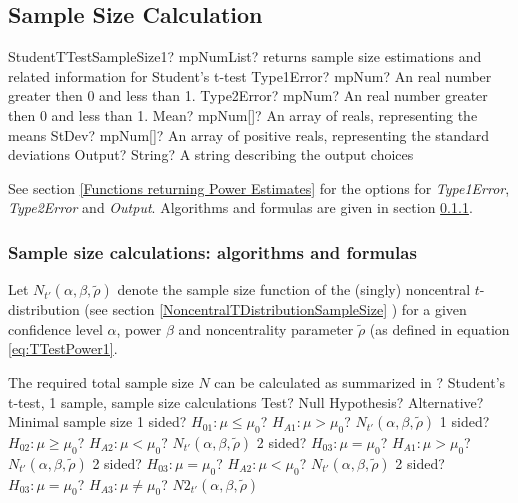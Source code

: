 \subsection{Sample Size Calculation}


\begin{mpFunctionsExtract}
	\mpFunctionFiveNotImplemented
	{StudentTTestSampleSize1? mpNumList? returns sample size estimations and related information for Student's t-test}
	{Type1Error? mpNum? An real number greater then 0 and less than 1.}
	{Type2Error? mpNum? An real number greater then 0 and less than 1.}
	{Mean? mpNum[]? An array of reals, representing the means}
	{StDev? mpNum[]? An array of positive reals, representing the standard deviations}
	{Output? String? A string describing the output choices}
\end{mpFunctionsExtract}

\vspace{0.3cm}
See section \ref{Functions returning Power Estimates} for the options for {\itshape\sffamily Type1Error},  {\itshape\sffamily Type2Error} and {\itshape\sffamily Output}. Algorithms and formulas are given in section \ref{1SampleTTest_SampleSize}.



\subsubsection{Sample size calculations: algorithms and formulas}
\label{1SampleTTest_SampleSize}
Let $N_{t'}\left(\alpha, \beta, \widetilde{\rho} \right)$ denote the sample size function of the (singly) noncentral $t$-distribution (see section \ref{NoncentralTDistributionSampleSize} ) for a given confidence level $\alpha$, power $\beta$ and noncentrality parameter $\widetilde{\rho}$ (as defined in equation \ref{eq:TTestPower1}. 


\mpTableFourColsTwoRowsThreeRows
{The required total sample size $N$ can be calculated as summarized in ? Student's t-test, 1 sample, sample size calculations}
{Test? Null Hypothesis? Alternative? Minimal sample size}
{1 sided? $H_{01}: \mu \leq \mu_0$? $H_{A1}: \mu > \mu_0$? $N_{t'}\left(\alpha, \beta, \widetilde{\rho} \right)$}
{1 sided? $H_{02}: \mu \geq \mu_0$? $H_{A2}: \mu < \mu_0$? $N_{t'}\left(\alpha, \beta, \widetilde{\rho} \right)$}
{2 sided? $H_{03}: \mu = \mu_0$? $H_{A1}: \mu > \mu_0$? $N_{t'}\left(\alpha, \beta, \widetilde{\rho} \right)$}
{2 sided? $H_{03}: \mu = \mu_0$? $H_{A2}: \mu < \mu_0$? $N_{t'}\left(\alpha, \beta, \widetilde{\rho} \right)$}
{2 sided? $H_{03}: \mu = \mu_0$? $H_{A3}: \mu \neq \mu_0$? $N2_{t'}\left(\alpha, \beta, \widetilde{\rho} \right)$}

